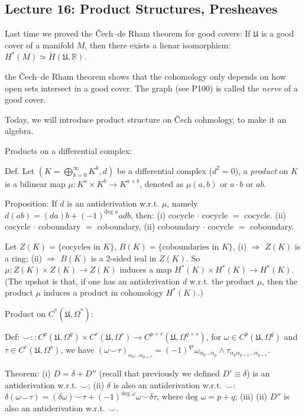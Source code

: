 \documentclass{article}
\theoremstyle{mystyle}
\theoremstyle{remark}
\numberwithin{equation}{section}
\begin{document}
\subsection{Lecture 16: Product Structures, Presheaves}

Last time we proved the Čech--de Rham theorem for good covers: If $\mathfrak{U}$ is a good cover of a manifold $M$, then there exists a lienar isomorphism: $H^*(M)\simeq \check{H}(\mathfrak{U},\underline{\mathbb{R}})$. 

the Čech--de Rham theorem shows that the cohomology only depends on how open sets intersect in a good cover. The graph (see P100) is called the \emph{nerve} of a good cover. 


Today, we will introduce product structure on Čech cohmology, to make it an algebra.

Products on a differential complex:

Def. Let $\left(K = \bigoplus_{k=0}^\infty K^k,d\right)$ be a differential complex ($d^2=0$), a \emph{product} on $K$ is a bilinear map $\mu\colon K^a\times K^b \rightarrow K^{a+b}$, denoted as $\mu(a,b)$ or $a\cdot b$ or $ab$. 

Proposition: If $d$ is an antiderivation w.r.t. $\mu$, namely $d(ab) = (da)b+(-1)^{\text{deg }a}adb$, then: (i) cocycle $\cdot$ cocycle $=$ cocycle. (ii) cocycle $\cdot$ coboundary $=$ coboundary, 
(ii) coboundary $\cdot$ cocycle $=$ coboundary.

Let $Z(K) = \{\text{cocycles in }K\}$, $B(K) = \{\text{coboundaries in }K\}$, (i) $\Rightarrow$ $Z(K)$ is a ring; (ii) $\Rightarrow$ $B(K)$ is a 2-sided ieal in $Z(K)$. So $\mu\colon Z(K)\times Z(K)\rightarrow Z(K)$ induces a map $H^*(K)\times H^*(K)\rightarrow H^*(K)$. (The upshot is that, if one has an antiderivation $d$ w.r.t. the product $\mu$, then the product $\mu$ induces a product in cohomology $H^*(K)$.)

Product on $C^*(\mathfrak{U},\Omega^*)$: 

Def: $\smile \colon \colon C^p(\mathfrak{U},\Omega^q)\times C^r(\mathfrak{U},\Omega^s) \rightarrow
C^{p+r}(\mathfrak{U},\Omega^{q+s})$, for $\omega \in C^p(\mathfrak{U},\Omega^q)$ and $\tau \in C^r(\mathfrak{U},\Omega^s)$, we have $(\omega\smile \tau)_{\alpha_0...\alpha_{p+r}}
=(-1)^{qr} \omega_{\alpha_0...\alpha_p} \wedge \tau_{\alpha_p\alpha_{p+1}...\alpha_{p+r}}$. 

Theorem: (i) $D = \delta+D''$ (recall that previously we defined $D' \equiv \delta$) is an antiderivation w.r.t. $\smile$; (ii) $\delta$ is also an antiderivation w.r.t. $\smile$: $\delta(\omega \smile \tau) = (\delta\omega)\smile \tau +(-1)^{\text{deg }\omega}\omega \smile \delta \tau$, where $\text{deg }\omega = p+q$; (iii) (ii) $D''$ is also an antiderivation w.r.t. $\smile$.
\end{document}
